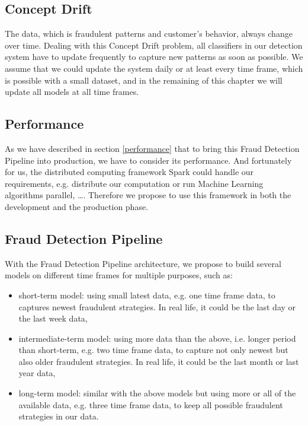 \subsection*{Concept Drift}

The data, which is fraudulent patterns and customer's behavior, always change over time. Dealing with this Concept Drift problem, all classifiers in our detection system have to update frequently to capture new patterns as soon as possible. We assume that we could update the system daily or at least every time frame, which is possible with a small dataset, and in the remaining of this chapter we will update all models at all time frames.


\subsection*{Performance}

As we have described in section \ref{performance} that to bring this Fraud Detection Pipeline into production, we have to consider its performance. And fortunately for us, the distributed computing framework Spark could handle our requirements, e.g. distribute our computation or run Machine Learning algorithms parallel, \dots. Therefore we propose to use this framework in both the development and the production phase.


\subsection*{Fraud Detection Pipeline}

With the Fraud Detection Pipeline architecture, we propose to build several models on different time frames for multiple purposes, such as:


\begin{itemize}
\item short-term model: using small latest data, e.g. one time frame data, to captures newest fraudulent strategies. In real life, it could be the last day or the last week data,
\item intermediate-term model: using more data than the above, i.e. longer period than short-term, e.g. two time frame data, to capture not only newest but also older fraudulent strategies. In real life, it could be the last month or last year data,
\item long-term model: similar with the above models but using more or all of the available data, e.g. three time frame data, to keep all possible fraudulent strategies in our data.
\end{itemize}


